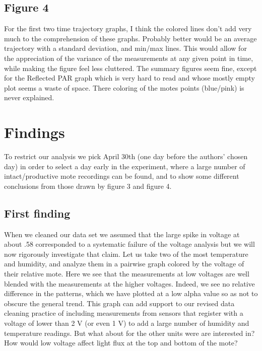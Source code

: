 \documentclass[english]{article}\usepackage[]{graphicx}\usepackage[]{color}
\begin{document}
\subsection{Figure 4}

For the first two time trajectory graphs, I think the colored lines don't
add very much to the comprehension of these graphs.  Probably better would be
an average trajectory with a standard deviation, and min/max lines.  This would
allow for the appreciation of the variance of the measurements at any given point
in time, while making the figure feel less cluttered.  The summary figures seem fine,
except for the Reflected PAR graph which is very hard to read and whose mostly empty
plot seems a waste of space.  There coloring of the motes points (blue/pink) is never explained.

\section{Findings}

To restrict our analysis we pick April 30th (one day before the authors' chosen day)
in order to select a day early in the experiment, where a large number of intact/productive
mote recordings can be found, and to show some different conclusions from those drawn
by figure 3 and figure 4.

\subsection{First finding}

When we cleaned our data set we assumed that the large spike in voltage
at about .58 corresponded to a systematic failure of the voltage analysis
but we will now rigorously investigate that claim.  Let us take two of the most
 temperature and humidity, and analyze them in a pairwise graph
colored by the voltage of their relative mote.  Here we see that the measurements
at low voltages are well blended with the measurements at the higher voltages.
Indeed, we see no relative difference in the patterns, which we have plotted at 
a low alpha value so as not to obscure the general trend.  This graph can add
support to our revised data cleaning practice of including measurements from 
sensors that register with a voltage of lower than 2 V (or even 1 V) to add a large number
of humidity and temperature readings.  But what about for the other units were are interested in?
How would low voltage affect light flux at the top and bottom of the mote?
\end{document}
